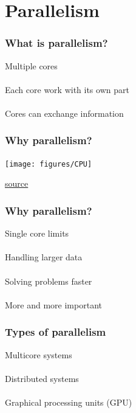 \documentclass{beamer}
\begin{document}
\section{Parallelism}

\begin{frame}
	\frametitle{What is parallelism?}
	\begin{center}
		Multiple cores \\~\\
		
		Each core work with its own part \\~\\
		
		Cores can exchange information
	\end{center}
\end{frame}

\begin{frame}
	\frametitle{Why parallelism?}
	\begin{table}[t]
		\begin{center}
			\texttt{[image: figures/CPU]}
		\end{center}
	\end{table}
	\href{http://www.gotw.ca/publications/concurrency-ddj.htm}{source}
\end{frame}

\begin{frame}
	\frametitle{Why parallelism?}
	\begin{center}
		Single core limits \\~\\
		
		Handling larger data \\~\\
		
		Solving problems faster \\~\\
		
		More and more important
	\end{center}
\end{frame}

\begin{frame}
	\frametitle{Types of parallelism}
	\begin{center}
		Multicore systems \\~\\
		
		Distributed systems \\~\\
		
		Graphical processing units (GPU) \\~\\
	\end{center}
\end{frame}
\end{document}
